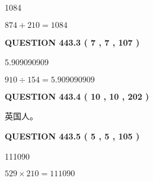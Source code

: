 \documentclass{ctexart}
\begin{document}
  
 
 
\noindent{}

1084
 
 
 
 
\noindent{}

$ %
874 +  %
210=   %
1084$
 
 
  
\vspace{0.2in}
  
{\textbf{\Large{QUESTION
443.3 
 ( 7 , 7 , 107 )
}}}
  
  
 
 
\noindent{}

5.909090909
 
 
 
 
\noindent{}

$ %
910 \div  %
154=   %
5.909090909$
 
 
  
\vspace{0.2in}
  
{\textbf{\Large{QUESTION
443.4 
 ( 10 , 10 , 202 )
}}}
  
  
 
 
\noindent{}
 
 
英国人。
 
 
 
 
  
\vspace{0.2in}
  
{\textbf{\Large{QUESTION
443.5 
 ( 5 , 5 , 105 )
}}}
  
  
 
 
\noindent{}

111090
 
 
 
 
\noindent{}

$ %
529 \times  %
210=   %
111090$
 
 
  
\vspace{0.2in}
  
\end{document}
